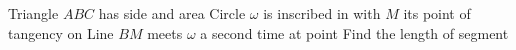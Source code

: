 Triangle $ABC$ has  side   and area   Circle $\omega$ is inscribed in  with $M$ its point of tangency on   Line $BM$ meets $\omega$ a second time at point   Find the length of segment 